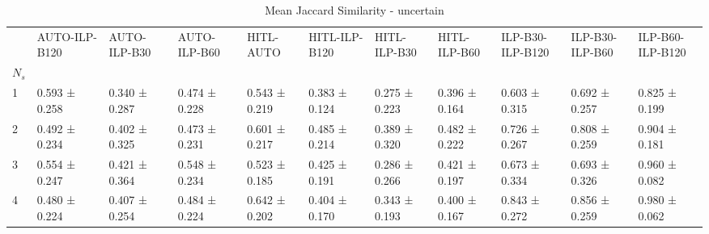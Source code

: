\begin{table}
\caption{Mean Jaccard Similarity - uncertain}
\label{tab:jaccard_similarity_uncertain}
\begin{tabular}{lllllllllll}
\toprule
 & AUTO-ILP-B120 & AUTO-ILP-B30 & AUTO-ILP-B60 & HITL-AUTO & HITL-ILP-B120 & HITL-ILP-B30 & HITL-ILP-B60 & ILP-B30-ILP-B120 & ILP-B30-ILP-B60 & ILP-B60-ILP-B120 \\
$N_s$ &  &  &  &  &  &  &  &  &  &  \\
\midrule
1 & 0.593 ± 0.258 & 0.340 ± 0.287 & 0.474 ± 0.228 & 0.543 ± 0.219 & 0.383 ± 0.124 & 0.275 ± 0.223 & 0.396 ± 0.164 & 0.603 ± 0.315 & 0.692 ± 0.257 & 0.825 ± 0.199 \\
2 & 0.492 ± 0.234 & 0.402 ± 0.325 & 0.473 ± 0.231 & 0.601 ± 0.217 & 0.485 ± 0.214 & 0.389 ± 0.320 & 0.482 ± 0.222 & 0.726 ± 0.267 & 0.808 ± 0.259 & 0.904 ± 0.181 \\
3 & 0.554 ± 0.247 & 0.421 ± 0.364 & 0.548 ± 0.234 & 0.523 ± 0.185 & 0.425 ± 0.191 & 0.286 ± 0.266 & 0.421 ± 0.197 & 0.673 ± 0.334 & 0.693 ± 0.326 & 0.960 ± 0.082 \\
4 & 0.480 ± 0.224 & 0.407 ± 0.254 & 0.484 ± 0.224 & 0.642 ± 0.202 & 0.404 ± 0.170 & 0.343 ± 0.193 & 0.400 ± 0.167 & 0.843 ± 0.272 & 0.856 ± 0.259 & 0.980 ± 0.062 \\
\bottomrule
\end{tabular}
\end{table}
